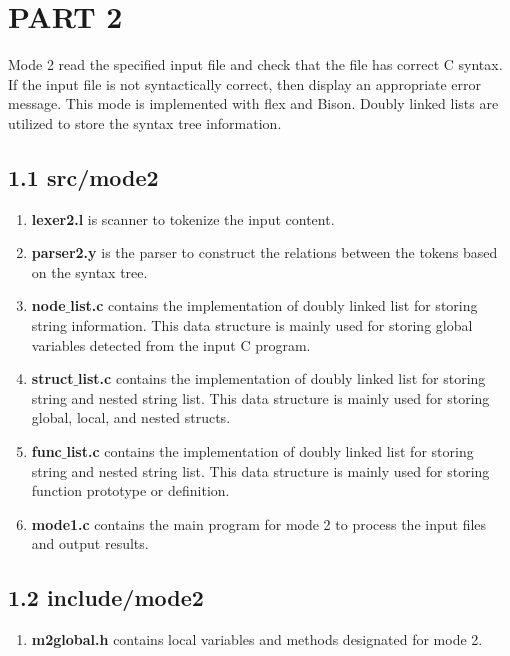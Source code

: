 \section*{PART 2}

Mode 2 read the specified input file and check that the file has correct C syntax. If the input file is not syntactically correct, then display an appropriate error message. This mode is implemented with flex and Bison. Doubly linked lists are utilized to store the syntax tree information.

\subsection*{1.1 \large\textbf{src/mode2}}
\begin{enumerate}
    \item \textbf{lexer2.l} is scanner to tokenize the input content.

    \item \textbf{parser2.y} is the parser to construct the relations between the tokens based on the syntax tree.

    \item \textbf{node$\_$list.c} contains the implementation of doubly linked list for storing string information. This data structure is mainly used for storing global variables detected from the input C program.
    
    \item \textbf{struct$\_$list.c} contains the implementation of doubly linked list for storing string and nested string list. This data structure is mainly used for storing global, local, and nested structs.

    \item \textbf{func$\_$list.c} contains the implementation of doubly linked list for storing string and nested string list. This data structure is mainly used for storing function prototype or definition.

    \item \textbf{mode1.c} contains the main program for mode 2 to process the input files and output results.
\end{enumerate}

\subsection*{1.2 \large\textbf{include/mode2}}
\begin{enumerate}
    \item \textbf{m2global.h} contains local variables and methods designated for mode 2.
\end{enumerate} 